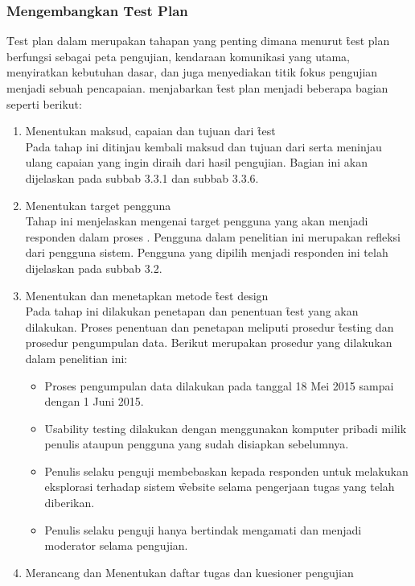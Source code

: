 \subsubsection{Mengembangkan \f{Test Plan}}
\f{Test plan} dalam \ust \space merupakan tahapan yang penting dimana menurut \citet{buku.rubin} \f{test plan} berfungsi sebagai peta pengujian, kendaraan komunikasi yang utama,  menyiratkan kebutuhan dasar, dan juga menyediakan titik fokus pengujian menjadi sebuah pencapaian. \citeauthor{buku.rubin} menjabarkan \f{test plan} menjadi beberapa bagian seperti berikut:
\begin{enumerate}[label=\alph*.]
	\item Menentukan maksud, capaian dan tujuan dari \f{test}\\
	Pada tahap ini ditinjau kembali maksud dan tujuan dari \ust \space serta meninjau ulang capaian yang ingin diraih dari hasil pengujian. Bagian ini akan dijelaskan pada subbab 3.3.1 dan subbab 3.3.6.
	\item Menentukan target pengguna\\
	Tahap ini menjelaskan mengenai target pengguna yang akan menjadi responden dalam proses \ust. Pengguna dalam penelitian ini merupakan refleksi dari pengguna sistem. Pengguna yang dipilih menjadi responden \ust \space ini telah dijelaskan pada subbab 3.2.
	\item Menentukan dan menetapkan metode \f{test design}\\
	Pada tahap ini dilakukan penetapan dan penentuan \f{test} yang akan dilakukan. Proses penentuan dan penetapan meliputi prosedur \f{testing} dan prosedur pengumpulan data. Berikut merupakan prosedur yang dilakukan dalam penelitian ini:
	\begin{itemize}
		\item Proses pengumpulan data dilakukan pada tanggal 18 Mei 2015 sampai dengan 1 Juni 2015.
		\item \f{Usability testing} dilakukan dengan menggunakan komputer pribadi milik penulis ataupun pengguna yang sudah disiapkan sebelumnya. 
		\item Penulis selaku penguji membebaskan kepada responden untuk melakukan eksplorasi terhadap sistem \f{website} selama pengerjaan tugas yang telah diberikan.
		\item Penulis selaku penguji hanya bertindak mengamati dan menjadi moderator selama pengujian.
	\end{itemize} 
	\item Merancang dan Menentukan daftar tugas dan kuesioner pengujian\\

\end{enumerate}
